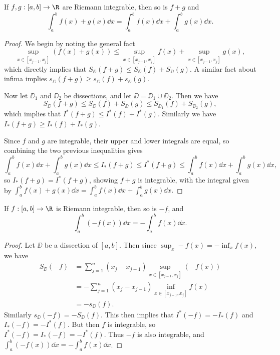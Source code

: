 \begin{proposition}
	If $f, g : [a, b] \rightarrow \R$ are Riemann integrable, then so is $f + g$ and
	$$
	\int_a^b f(x) + g(x) \dd x = \int_a^b f(x) \dd x + \int_a^b g(x) \dd x.
	$$
\end{proposition}
\begin{proof}
		We begin by noting the general fact
	$$
	\sup_{x\in[x_{j - 1}, x_j]} (f(x) + g(x)) \leq \sup_{x\in[x_{j - 1}, x_j]}  f(x) + \sup_{x\in[x_{j - 1}, x_j]} g(x),
	$$
	which directly implies that $S_{\DD}(f + g) \leq S_{\DD}(f) + S_{\DD}(g)$. A similar fact about infima implies $s_{\DD}(f + g) \geq s_{\DD}(f) + s_{\DD}(g)$.

	Now let $\DD_1$ and $\DD_2$ be dissections, and let $\DD = \DD_1 \cup \DD_2$. Then we have 
		$$
		S_{\DD}(f + g) \leq S_{\DD}(f) + S_{\DD}(g) \leq S_{\DD_1}(f) + S_{\DD_2}(g),
		$$
		which implies that $I^*(f + g) \leq I^*(f) + I^*(g)$.
		Similarly we have $I_*(f + g) \geq I_*(f) + I_*(g)$.

		Since $f$ and $g$ are integrable, their upper and lower integrals are equal, so combining the two previous inequalities gives
		$$
		\int_a^b f(x) \dd x + \int_a^b g(x) \dd x \leq I_{*}(f+g) \leq I^{*}(f+g) \leq \int_a^b f(x) \dd x + \int_a^b g(x) \dd x,
		$$
		so $I_{*}(f+g) = I^{*}(f+g)$, showing $f + g$ is integrable, with the integral given by
		$
		\int_a^b f(x) + g(x) \dd x = \int_a^b f(x) \dd x + \int_a^b g(x) \dd x.
		$
\end{proof}

\begin{proposition}
	If $f:[a, b] \rightarrow \R$ is Riemann integrable, then so is $-f$, and
	$$
	\int_a^b (-f(x)) \dd x = - \int_a^b f(x) \dd x.
	$$
\end{proposition}
\begin{proof}
	Let $\DD$ be a dissection of $[a, b]$. Then since $\sup_x -f(x) = - \inf_x f(x)$, we have
	\begin{align*}
		S_{\DD} (-f) &= \sum_{j = 1}^n (x_{j} - x_{j - 1}) \sup_{x \in[x_{j - 1}, x_j]} (-f(x)) \\
		&= -\sum_{j = 1}^n (x_{j} - x_{j - 1}) \inf_{x \in[x_{j - 1}, x_j]} f(x) \\
		&= -s_\DD(f).
	\end{align*}
	Similarly $s_\DD(-f) = -S_\DD(f)$. This then implies that $I^*(-f) = -I_*(f)$ and $I_*(-f) = -I^*(f)$. But then $f$ is integrable, so $I^*(-f) = I_*(-f) = -I^*(f)$. Thus $-f$ is also integrable, and $\int_a^b (-f(x)) \dd x = - \int_a^b f(x) \dd x$.
\end{proof}


